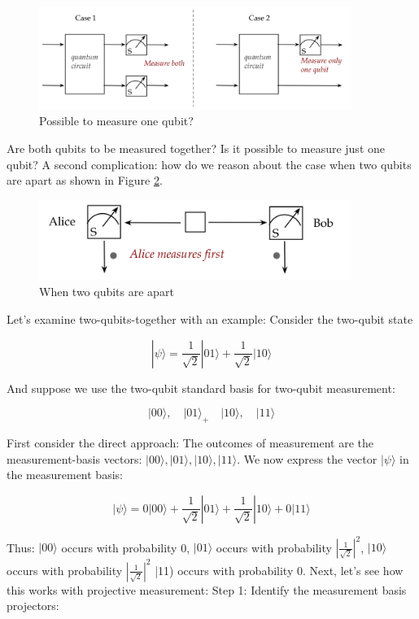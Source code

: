 \documentclass[main.tex]{subfiles}
\begin{document}
    \begin{figure}
        \centering
        \includegraphics[width=4in]{notes/figs/n07/02measure1.png}
        \caption{Possible to measure one qubit?}
        \label{fig:02measure1}
    \end{figure} 
    
    Are both qubits to be measured together? Is it possible to measure just one qubit? A second complication: how do we reason about the case when two qubits are apart as shown in Figure \ref{fig:03measure2}.
    
    \begin{figure}
        \centering
        \includegraphics[width=4in]{notes/figs/n07/03measure2.png}
        \caption{When two qubits are apart}
        \label{fig:03measure2}
    \end{figure} 
    
    Let's examine two-qubits-together with an example: Consider the two-qubit state
    
    $$
    |\psi\rangle=\frac{1}{\sqrt{2}}|01\rangle+\frac{1}{\sqrt{2}}|10\rangle
    $$
    
    And suppose we use the two-qubit standard basis for two-qubit measurement:
    
    $$
    |00\rangle, \quad|01\rangle_{+} \quad|10\rangle, \quad|11\rangle
    $$
    
    First consider the direct approach: The outcomes of measurement are the measurement-basis vectors: $|00\rangle,|01\rangle,|10\rangle,|11\rangle$. We now express the vector $|\psi\rangle$ in the measurement basis:
    
    $$
    |\psi\rangle=0|00\rangle+\frac{1}{\sqrt{2}}|01\rangle+\frac{1}{\sqrt{2}}|10\rangle+0|11\rangle
    $$
    
    Thus: $|00\rangle$ occurs with probability 0, $|01\rangle$ occurs with probability $\left|\frac{1}{\sqrt{2}}\right|^{2}$, $|10\rangle$ occurs with probability $\left|\frac{1}{\sqrt{2}}\right|^{2}$ |11) occurs with probability 0. Next, let's see how this works with projective measurement: Step 1: Identify the measurement basis projectors:
    
\end{document}
